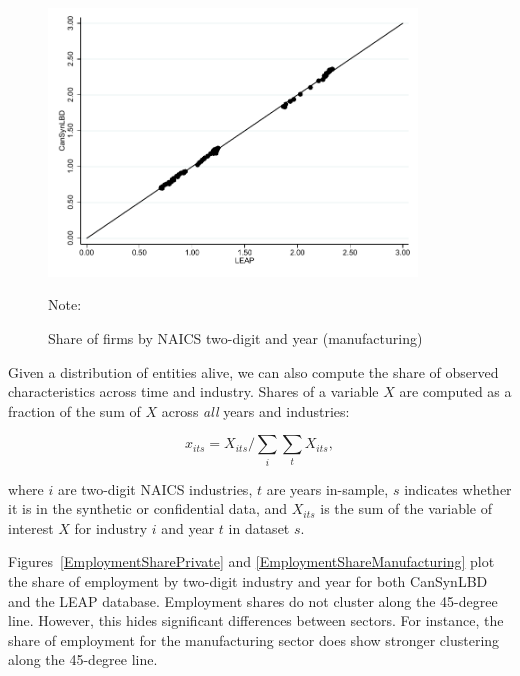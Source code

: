 \vspace{-15.5pt}
\begin{figure} [H]
\centering
\caption{Share of firms by NAICS two-digit and year (manufacturing)} \label{FirmShareManufacturing}
\includegraphics[height=2.8in, width=.7\linewidth]{graphs/Share_of_firms_by_NAICS_two-digit_and_year_Manufacturing_bw.pdf} 
\begin{minipage}{0.85\textwidth}
{\footnotesize Note: \CanTableNote \par}
\end{minipage}
\end{figure}

Given a distribution of entities alive, we can also compute the share of observed characteristics across time and industry. Shares of a variable $X$ are computed as a fraction of the sum of $X$ across \textit{all} years and industries:

\begin{equation}
    \label{eq:share_employment}
x_{its} = X_{its}/\sum_{i} \sum_{t} X_{its}, 
\end{equation}

where $i$ are two-digit NAICS industries, $t$ are  years in-sample, $s$ indicates whether it is in the synthetic or confidential data, and $X_{its}$ is the sum of the variable of interest $X$ for industry $i$ and year $t$ in  dataset $s$.

Figures~\ref{EmploymentSharePrivate} and \ref{EmploymentShareManufacturing} plot the share of employment by two-digit industry and year for both  CanSynLBD and the LEAP database. 
Employment shares  do not cluster along the 45-degree line. However, this hides significant differences between sectors. For instance,  the share of employment for the manufacturing sector does show stronger clustering along the 45-degree line.

